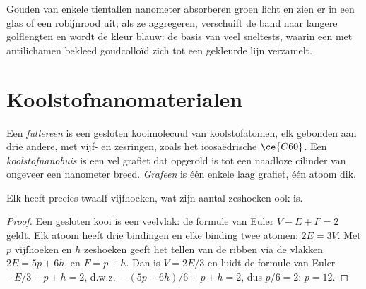 Gouden  van enkele tientallen nanometer absorberen groen
licht en zien er in een glas of een  robijnrood uit; als ze
aggregeren, verschuift de band naar langere golflengten en wordt de kleur
blauw: de basis van veel sneltests, waarin een met antilichamen bekleed
goudcolloïd zich tot een gekleurde lijn verzamelt.

\section{Koolstofnanomaterialen}

\begin{definition}[Koolstofnanomaterialen]\label{def:b3:inorganic-materials:carbon}
Een \emph{fullereen} is een gesloten kooimolecuul van
koolstofatomen, elk gebonden aan drie andere, met vijf- en zesringen,
zoals het icosaëdrische $\ce{C60}$. Een \emph{koolstofnanobuis} is een vel
grafiet dat opgerold is tot een naadloze cilinder van ongeveer een
nanometer breed.
\emph{Grafeen} is één enkele laag grafiet, één atoom dik.
\end{definition}

\begin{proposition}\label{prop:b3:inorganic-materials:euler}
Elk  heeft precies twaalf vijfhoeken, wat zijn aantal zeshoeken
ook is.
\end{proposition}

\begin{proof}
Een gesloten kooi is een veelvlak: de formule van Euler $V - E + F = 2$ geldt. Elk atoom heeft
drie bindingen en elke binding twee atomen: $2E = 3V$. Met $p$ vijfhoeken en $h$ zeshoeken
geeft het tellen van de ribben via de vlakken $2E = 5p + 6h$, en $F = p + h$. Dan is $V = 2E/3$ en luidt de
formule van Euler $-E/3 + p + h = 2$, d.w.z.\ $-(5p + 6h)/6 + p + h = 2$, dus $p/6 = 2$: $p = 12$.
\end{proof}


